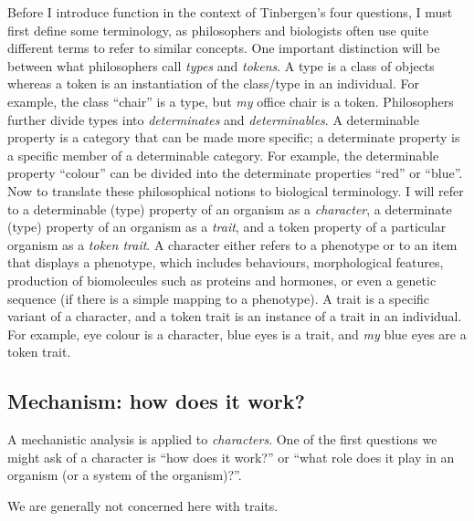 \documentclass{article}
\begin{document}
Before I introduce function in the context of Tinbergen's four questions, I must first define some terminology, as philosophers and biologists often use quite different terms to refer to similar concepts.
One important distinction will be between what philosophers call \emph{types} and \emph{tokens}.
A type is a class of objects whereas a token is an instantiation of the class/type in an individual.
For example, the class ``chair'' is a type, but \emph{my} office chair is a token.
Philosophers further divide types into \emph{determinates} and \emph{determinables}.
A determinable property is a category that can be made more specific; a determinate property is a specific member of a determinable category. 
For example, the determinable property ``colour'' can be divided into the determinate properties ``red'' or ``blue''.
Now to translate these philosophical notions to biological terminology.
I will refer to a determinable (type) property of an organism as a \emph{character}, a determinate (type) property of an organism as a \emph{trait}, and a token property of a particular organism as a \emph{token trait}.
A character either refers to a phenotype or to an item that displays a phenotype, which includes behaviours, morphological features, production of biomolecules such as proteins and hormones, or even a genetic sequence (if there is a simple mapping to a phenotype).
A trait is a specific variant of a character, and a token trait is an instance of a trait in an individual.
For example, eye colour is a character, blue eyes is a trait, and \emph{my} blue eyes are a token trait.

\subsection{Mechanism: how does it work?}
\label{sec:mechanism}

A mechanistic analysis is applied to \emph{characters}.
One of the first questions we might ask of a character is ``how does it work?'' or ``what role does it play in an organism (or a system of the organism)?''.

We are generally not concerned here with traits.
\end{document}
